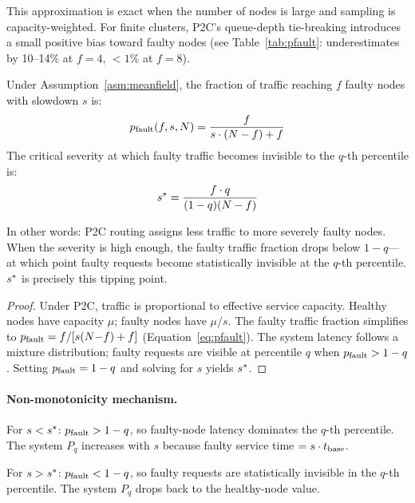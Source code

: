 This approximation is exact when the number of nodes is large and
sampling is capacity-weighted. For finite clusters, P2C's
queue-depth tie-breaking introduces a small positive bias toward
faulty nodes (see Table~\ref{tab:pfault}: underestimates by 10--14\%
at $f = 4$, $< 1$\% at $f = 8$).

\medskip

\begin{theorem}
\label{thm:sstar}
Under Assumption~\ref{asm:meanfield}, the
fraction of traffic reaching $f$ faulty nodes with slowdown $s$ is:
\begin{equation}
  p_{\text{fault}}(f, s, N) = \frac{f}{s \cdot (N-f) + f}
  \label{eq:pfault}
\end{equation}
The critical severity at which faulty traffic becomes invisible to the
$q$-th percentile is:
\begin{equation}
  s^{*} = \frac{f \cdot q}{(1-q)(N-f)}
  \label{eq:sstar_deriv}
\end{equation}
\end{theorem}

In other words: P2C routing assigns less traffic to more severely
faulty nodes. When the severity is high enough, the faulty traffic
fraction drops below $1-q$---at which point faulty requests become
statistically invisible at the $q$-th percentile.
$s^{*}$ is precisely this tipping point.

\begin{proof}
Under P2C, traffic is proportional to effective service capacity.
Healthy nodes have capacity $\mu$; faulty nodes have $\mu/s$.
The faulty traffic fraction simplifies to
$p_{\text{fault}} = f / [s(N{-}f) + f]$ (Equation~\ref{eq:pfault}).
The system latency follows a mixture distribution;
faulty requests are visible at percentile $q$ when $p_{\text{fault}} > 1-q$.
Setting $p_{\text{fault}} = 1-q$ and solving for $s$ yields $s^{*}$.
\end{proof}

\medskip

\paragraph{Non-monotonicity mechanism.}
For $s < s^{*}$: $p_{\text{fault}} > 1-q$, so faulty-node latency dominates the
$q$-th percentile. The system $P_q$ increases with $s$ because faulty
service time $= s \cdot t_{\text{base}}$.

For $s > s^{*}$: $p_{\text{fault}} < 1-q$, so faulty requests are statistically
invisible in the $q$-th percentile. The system $P_q$ drops back to the
healthy-node value.

